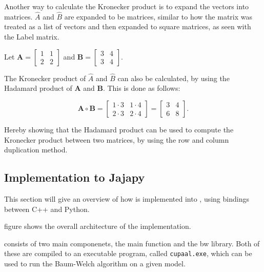 Another way to calculate the Kronecker product is to expand the vectors into matrices.
$\hat{A}$ and $\hat{B}$ are expanded to be matrices, similar to how the matrix was treated as a list of vectors and then expanded to square matrices, as seen with the Label matrix.

Let $\mathbf{A} = \begin{bmatrix}
        1 & 1 \\
        2 & 2
    \end{bmatrix}$ and
$\mathbf{B} = \begin{bmatrix}
        3 & 4 \\
        3 & 4
    \end{bmatrix}$.

The Kronecker product of $\hat{A}$ and $\hat{B}$ can also be calculated, by using the Hadamard product of $\mathbf{A}$ and $\mathbf{B}$.
This is done as follows:

\begin{equation}
    \mathbf{A} \circ \mathbf{B} = \begin{bmatrix}
        1 \cdot 3 & 1 \cdot 4 \\
        2 \cdot 3 & 2 \cdot 4
    \end{bmatrix} = \begin{bmatrix}
        3 & 4 \\
        6 & 8
    \end{bmatrix}.
\end{equation}

Hereby showing that the Hadamard product can be used to compute the Kronecker product between two matrices, by using the row and column duplication method.




\subsection{Implementation to Jajapy}\label{subsec:implementation-to-jajapy}
This section will give an overview of how \Cupaal is implemented into \Jajapy, using bindings between C++ and Python.

figure  shows the overall architecture of the implementation.

\Cupaal consists of two main componenets, the main function and the \gls{bw} library.
Both of these are compiled to an executable program, called \texttt{cupaal.exe}, which can be used to run the Baum-Welch algorithm on a given model.

